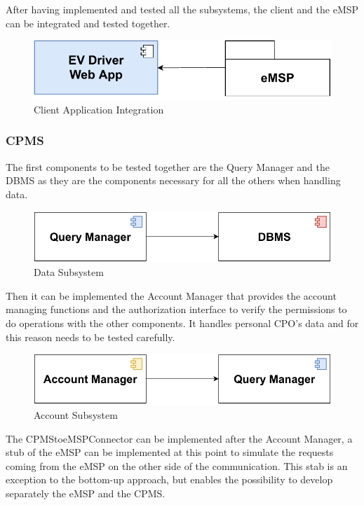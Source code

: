 After having implemented and tested all the subsystems, the client and the eMSP can be integrated 
and tested together. 
\begin{figure}[H]
    \centering
    \includegraphics[scale=0.6]{src/Integration/eMSP_Frontend.pdf}
    \caption{Client Application Integration}
\end{figure}


\subsubsection{CPMS}
The first components to be tested together are the Query Manager and the DBMS as they are the
components necessary for all the others when handling data.
\begin{figure}[H]
    \centering
    \includegraphics[scale=0.6]{src/Integration/CPMS_Query.pdf}
    \caption{Data Subsystem}
\end{figure}
Then it can be implemented the Account Manager that provides the account managing functions and the authorization interface 
to verify the permissions to do operations with the other components. It handles personal CPO's data and for this reason needs
to be tested carefully.
\begin{figure}[H]
    \centering
    \includegraphics[scale=0.6]{src/Integration/CPMS_Account.pdf}
    \caption{Account Subsystem}
\end{figure}
The CPMStoeMSPConnector can be implemented after the Account Manager, a stub of the eMSP can be implemented at this point to simulate
the requests coming from the eMSP on the other side of the communication. This stab is an exception to the bottom-up approach, but
enables the possibility to develop separately the eMSP and the CPMS. 
